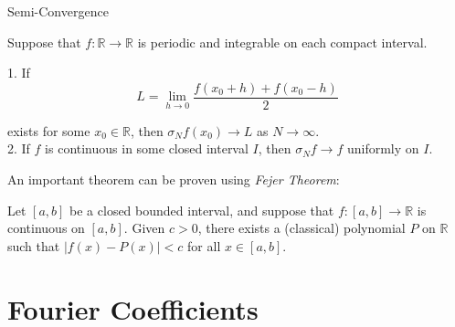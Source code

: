 \documentclass{beamer}
\begin{document}
\begin{frame}{Semi-Convergence}
\small
\begin{theorem}[Fejer]
    Suppose that $f: \mathbb{R} \to \mathbb{R}$ is periodic and integrable on each compact interval.

        1. If \begin{equation*}
             L = \lim_{h \to 0} \frac{f(x_0 + h) + f(x_0 - h)}{2}
        \end{equation*}

        exists for some $x_0 \in \mathbb{R}$, then $\sigma_Nf(x_0) \to L$ as $N \to \infty$.   \\
        2. If \(f\) is continuous in some closed interval $I$, then $\sigma_Nf \to f$ uniformly on $I$.

\end{theorem}

An important theorem can be proven using \textit{Fejer Theorem}:
\begin{theorem}
Let $[a, b]$ be a closed bounded interval, and suppose that $f : [a, b] \rightarrow \mathbb{R}$ is continuous on $[a, b]$. Given $c > 0$, there exists a (classical) polynomial $P$ on $\mathbb{R}$ such that $|f(x) - P(x)| < c$ for all $x \in [a, b]$.

\end{theorem}
\end{frame}



\section{Fourier Coefficients}
\end{document}

